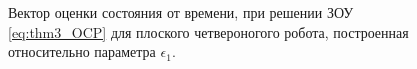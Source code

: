 \begin{figure}[ht]
	\caption{Вектор оценки состояния от времени, при решении ЗОУ \eqref{eq:thm3_OCP} для плоского четвероногого робота, построенная относительно параметра $\epsilon_1$.}\label{fig:mult_unit_state_hat}
\end{figure} 

